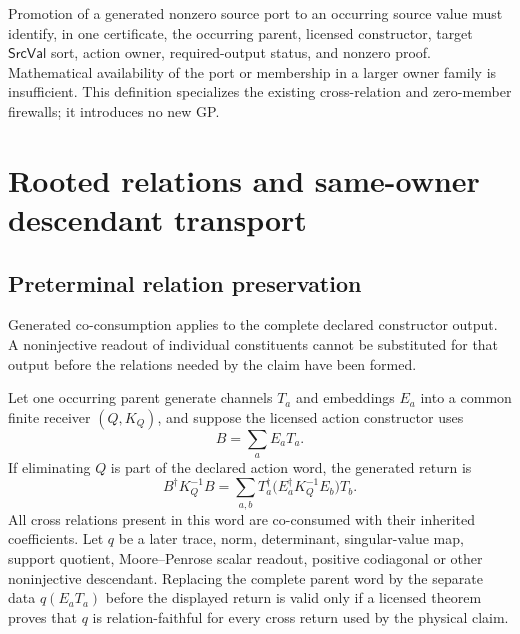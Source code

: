 \documentclass[12pt,a4paper]{article}
\begin{document}
\begin{definition}
\label{p2a:def:v3100-source-incidence-certificate}
Promotion of a generated nonzero source port to an occurring source value must
identify, in one certificate, the occurring parent, licensed constructor,
target $\mathsf{SrcVal}$ sort, action owner, required-output status, and
nonzero proof.  Mathematical availability of the port or membership in a
larger owner family is insufficient.  This definition specializes the existing
cross-relation and zero-member firewalls; it introduces no new GP.
\end{definition}




\section{Rooted relations and same-owner descendant transport}
\label{p2a:sec:clean-rooted-relations}
\subsection{Preterminal relation preservation}
\label{p2a:sec:v3102-preterminal-relation-preservation}
Generated co-consumption applies to the complete declared constructor output.
A noninjective readout of individual constituents cannot be substituted for
that output before the relations needed by the claim have been formed.

\begin{theorem}
\label{p2a:thm:v3102-preterminal-relation-preservation}
Let one occurring parent generate channels $T_a$ and embeddings $E_a$ into a
common finite receiver $(Q,K_Q)$, and suppose the licensed action constructor
uses
\[
 B=\sum_aE_aT_a.
\]
If eliminating $Q$ is part of the declared action word, the generated return is
\[
 \boxed{
 B^\dagger K_Q^{-1}B
 =\sum_{a,b}T_a^\dagger
    \bigl(E_a^\dagger K_Q^{-1}E_b\bigr)T_b.}
\]
All cross relations present in this word are co-consumed with their inherited
coefficients.  Let $q$ be a later trace, norm, determinant, singular-value
map, support quotient, Moore--Penrose scalar readout, positive codiagonal or
other noninjective descendant.  Replacing the complete parent word by the
separate data $q(E_aT_a)$ before the displayed return is valid only if a
licensed theorem proves that $q$ is relation-faithful for every cross return
used by the physical claim.
\end{theorem}
\end{document}

